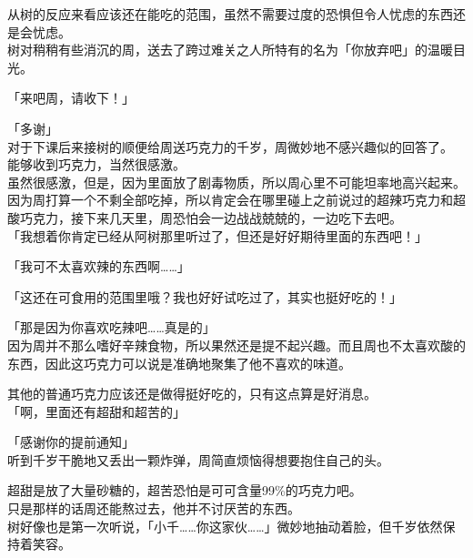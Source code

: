 从树的反应来看应该还在能吃的范围，虽然不需要过度的恐惧但令人忧虑的东西还是会忧虑。\\

树对稍稍有些消沉的周，送去了跨过难关之人所特有的名为「你放弃吧」的温暖目光。\\

\vspace{2\baselineskip}

「来吧周，请收下！」

「多谢」\\

对于下课后来接树的顺便给周送巧克力的千岁，周微妙地不感兴趣似的回答了。\\

能够收到巧克力，当然很感激。\\

虽然很感激，但是，因为里面放了剧毒物质，所以周心里不可能坦率地高兴起来。\\

因为周打算一个不剩全部吃掉，所以肯定会在哪里碰上之前说过的超辣巧克力和超酸巧克力，接下来几天里，周恐怕会一边战战兢兢的，一边吃下去吧。\\

「我想着你肯定已经从阿树那里听过了，但还是好好期待里面的东西吧！」

「我可不太喜欢辣的东西啊……」

「这还在可食用的范围里哦？我也好好试吃过了，其实也挺好吃的！」

「那是因为你喜欢吃辣吧……真是的」\\

因为周并不那么嗜好辛辣食物，所以果然还是提不起兴趣。而且周也不太喜欢酸的东西，因此这巧克力可以说是准确地聚集了他不喜欢的味道。

其他的普通巧克力应该还是做得挺好吃的，只有这点算是好消息。\\

「啊，里面还有超甜和超苦的」

「感谢你的提前通知」\\

听到千岁干脆地又丢出一颗炸弹，周简直烦恼得想要抱住自己的头。

超甜是放了大量砂糖的，超苦恐怕是可可含量99\%的巧克力吧。\\

只是那样的话周还能熬过去，他并不讨厌苦的东西。\\

树好像也是第一次听说，「小千……你这家伙……」微妙地抽动着脸，但千岁依然保持着笑容。\\

